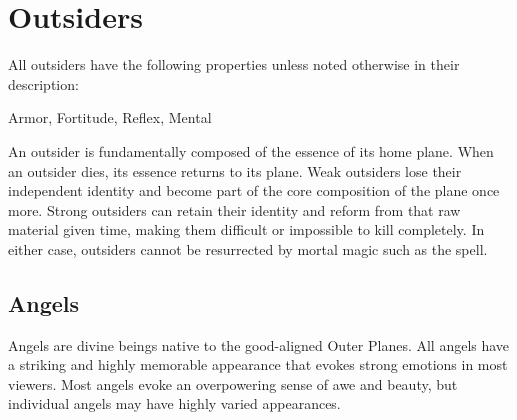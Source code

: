   
        \section{Outsiders}

        All outsiders have the following properties unless noted otherwise in their description:
        
    
     Armor,
     Fortitude,
     Reflex,
     Mental
  
     An outsider is fundamentally composed of the essence of its home plane.
    When an outsider dies, its essence returns to its plane.
    Weak outsiders lose their independent identity and become part of the core composition of the plane once more.
    Strong outsiders can retain their identity and reform from that raw material given time, making them difficult or impossible to kill completely.
    In either case, outsiders cannot be resurrected by mortal magic such as the  spell.
  
      
    \subsection{Angels}
      
      Angels are divine beings native to the good-aligned Outer Planes.
      All angels have a striking and highly memorable appearance that evokes strong emotions in most viewers.
      Most angels evoke an overpowering sense of awe and beauty, but individual angels may have highly varied appearances.
    

      


